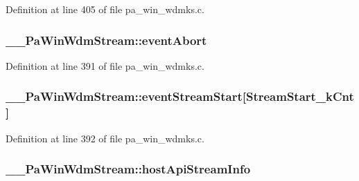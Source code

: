 Definition at line 405 of file pa\+\_\+win\+\_\+wdmks.\+c.

\subsubsection[{\texorpdfstring{event\+Abort}{eventAbort}}]{ \+\_\+\+\_\+\+Pa\+Win\+Wdm\+Stream\+::event\+Abort}\hypertarget{struct_____pa_win_wdm_stream_a2ec042a491ca1d0d8a071f4c4901e4c4}{}\label{struct_____pa_win_wdm_stream_a2ec042a491ca1d0d8a071f4c4901e4c4}


Definition at line 391 of file pa\+\_\+win\+\_\+wdmks.\+c.

\subsubsection[{\texorpdfstring{event\+Stream\+Start}{eventStreamStart}}]{ \+\_\+\+\_\+\+Pa\+Win\+Wdm\+Stream\+::event\+Stream\+Start\mbox{[}{\bf Stream\+Start\+\_\+k\+Cnt}\mbox{]}}\hypertarget{struct_____pa_win_wdm_stream_a03f53464c73a442fdb86f340fe54e369}{}\label{struct_____pa_win_wdm_stream_a03f53464c73a442fdb86f340fe54e369}


Definition at line 392 of file pa\+\_\+win\+\_\+wdmks.\+c.

\subsubsection[{\texorpdfstring{host\+Api\+Stream\+Info}{hostApiStreamInfo}}]{ \+\_\+\+\_\+\+Pa\+Win\+Wdm\+Stream\+::host\+Api\+Stream\+Info}\hypertarget{struct_____pa_win_wdm_stream_a3dbf6fed2412e92984b34fba10cbfeb5}{}\label{struct_____pa_win_wdm_stream_a3dbf6fed2412e92984b34fba10cbfeb5}


